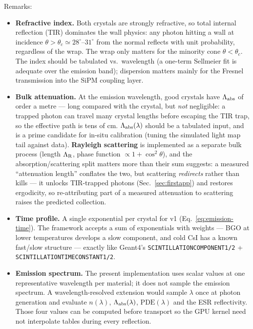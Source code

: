 \documentclass[11pt,a4paper]{article}
\newcommand{\csi}{CsI}
\newcommand{\bgo}{BGO}
\begin{document}
Remarks:
\begin{itemize}
  \item \textbf{Refractive index.} Both crystals are strongly refractive, so total internal
    reflection (TIR) dominates the wall physics: any photon hitting a wall at incidence
    $\theta > \theta_c \simeq 28^\circ\text{--}31^\circ$ from the normal reflects with unit
    probability, regardless of the wrap. The wrap only matters for the minority cone
    $\theta < \theta_c$. The index should be tabulated vs.\ wavelength (a one-term Sellmeier
    fit is adequate over the emission band); dispersion matters mainly for the Fresnel
    transmission into the SiPM coupling layer.
  \item \textbf{Bulk attenuation.} At the emission wavelength, good crystals have
    $\Lambda_{\rm abs}$ of order a metre --- long compared with the crystal, but \emph{not}
    negligible: a trapped photon can travel many crystal lengths before escaping the TIR
    trap, so the effective path is tens of cm. $\Lambda_{\rm abs}(\lambda)$ should be a
    tabulated input, and is a prime candidate for in-situ calibration (tuning the simulated
    light map tail against data). \textbf{Rayleigh scattering} is implemented as a separate
    bulk process (length $\Lambda_{\rm R}$, phase function $\propto 1+\cos^2\theta$), and
    the absorption/scattering split matters more than their sum suggests: a measured
    ``attenuation length'' conflates the two, but scattering \emph{redirects} rather than
    kills --- it unlocks TIR-trapped photons (Sec.~\ref{sec:firstapp}) and restores
    ergodicity, so re-attributing part of a measured attenuation to scattering raises the
    predicted collection.
  \item \textbf{Time profile.} A single exponential per crystal for v1
    (Eq.~\ref{eq:emission-time}). The framework accepts a sum of exponentials with weights
    --- \bgo{} at lower temperatures develops a slow component, and cold \csi{} has a known
    fast/slow structure --- exactly like Geant4's
    \texttt{SCINTILLATIONCOMPONENT1/2} + \texttt{SCINTILLATIONTIMECONSTANT1/2}.
  \item \textbf{Emission spectrum.} The present implementation uses scalar values at one
    representative wavelength per material; it does not sample the emission spectrum.
    A wavelength-resolved extension would sample $\lambda$ once at photon generation and
    evaluate $n(\lambda)$, $\Lambda_{\rm abs}(\lambda)$,
    $\mathrm{PDE}(\lambda)$ and the ESR reflectivity. Those four values can be computed
    before transport so the GPU kernel need not interpolate tables during every reflection.
\end{itemize}
\end{document}
